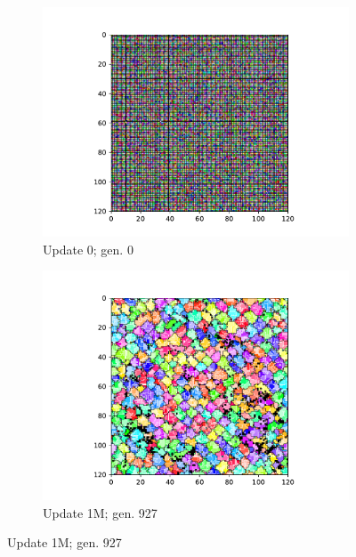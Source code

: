 \begin{figure}%
\begin{center}
\begin{subfigure}[b]{0.6\columnwidth}
  \includegraphics[width=\columnwidth,trim={2.5cm 0.5cm 2.5cm 1cm},clip]{img/ChannelMap_1011_update0}
  \caption{Update 0; gen. 0}
  \label{fig:ChannelMap_1011_update0}
\end{subfigure}%
\begin{subfigure}[b]{0.6\columnwidth}
  \includegraphics[width=\columnwidth,trim={2.5cm 0.5cm 2.5cm 1cm},clip]{img/ChannelMap_1011_update1000000}
  \caption{Update 1M; gen. 927}
  \label{fig:ChannelMap_1011_update1000000}
\end{subfigure}%

\end{center}
\end{figure}
